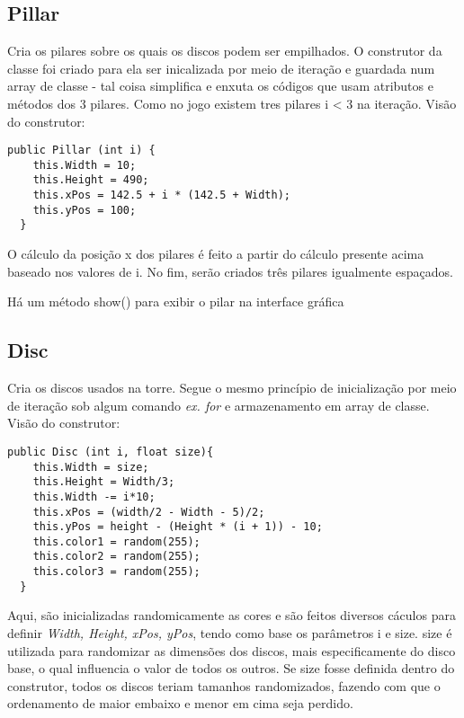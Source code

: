 \documentclass[
	12pt,				%
	oneside,			%
	a4paper,			%
	english,			%
	brazil,				%
	]{abntex2}
\begin{document}
{ \subsection{Pillar}
 Cria os pilares sobre os quais os discos podem ser empilhados. O construtor da classe foi criado para ela ser inicalizada por meio de iteração e guardada num array de classe - tal coisa simplifica e enxuta os códigos que usam atributos e métodos dos 3 pilares. Como no jogo existem tres pilares i < 3 na iteração. Visão do construtor:

\begin{itshape}
\begin{verbatim}
public Pillar (int i) {
    this.Width = 10;
    this.Height = 490;
    this.xPos = 142.5 + i * (142.5 + Width);
    this.yPos = 100;
  }
\end{verbatim}
\end{itshape}

O cálculo da posição x dos pilares é feito a partir do cálculo presente acima baseado nos valores de i. No fim, serão criados três pilares igualmente espaçados. 

Há um método show() para exibir o pilar na interface gráfica

\subsection{Disc}
Cria os discos usados na torre. Segue o mesmo princípio de inicialização por meio de iteração sob algum comando \textit{ex. for} e armazenamento em array de classe. Visão do construtor:

\begin{itshape}
\begin{verbatim}
public Disc (int i, float size){
    this.Width = size;
    this.Height = Width/3;
    this.Width -= i*10;
    this.xPos = (width/2 - Width - 5)/2;
    this.yPos = height - (Height * (i + 1)) - 10;
    this.color1 = random(255);
    this.color2 = random(255);
    this.color3 = random(255);
  }
\end{verbatim}
\end{itshape}
Aqui, são inicializadas randomicamente as cores e são feitos diversos cáculos para definir \textit{Width, Height, xPos, yPos}, tendo como base os parâmetros i e size. size é utilizada para randomizar as dimensões dos discos, mais especificamente do disco base, o qual influencia o valor de todos os outros. Se size fosse definida dentro do construtor, todos os discos teriam tamanhos randomizados, fazendo com que o ordenamento de maior embaixo e menor em cima seja perdido.

}
\end{document}
